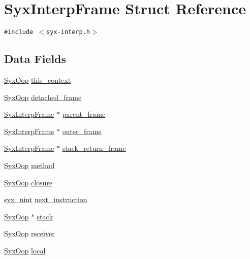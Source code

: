 \hypertarget{struct_syx_interp_frame}{
\section{SyxInterpFrame Struct Reference}
\label{struct_syx_interp_frame}
}
{\tt \#include $<$syx-interp.h$>$}

\subsection*{Data Fields}
\begin{CompactItemize}
\item 
\hyperlink{syx-types_8h_1121caba2d40b2ce090b640762744ccd}{SyxOop} \hyperlink{struct_syx_interp_frame_37d33bf761d4f34c55da10cbf9d3df63}{this\_\-context}
\item 
\hyperlink{syx-types_8h_1121caba2d40b2ce090b640762744ccd}{SyxOop} \hyperlink{struct_syx_interp_frame_f3ecaeed999a18d99d3fd27e9450ab41}{detached\_\-frame}
\item 
\hyperlink{struct_syx_interp_frame}{SyxInterpFrame} $\ast$ \hyperlink{struct_syx_interp_frame_e1b68af7dec8776cd14b3d1df923409c}{parent\_\-frame}
\item 
\hyperlink{struct_syx_interp_frame}{SyxInterpFrame} $\ast$ \hyperlink{struct_syx_interp_frame_335377c41e8c70178ad2a5ddf66508b4}{outer\_\-frame}
\item 
\hyperlink{struct_syx_interp_frame}{SyxInterpFrame} $\ast$ \hyperlink{struct_syx_interp_frame_da8f1ef4a738fbc3289aad49cf419a6e}{stack\_\-return\_\-frame}
\item 
\hyperlink{syx-types_8h_1121caba2d40b2ce090b640762744ccd}{SyxOop} \hyperlink{struct_syx_interp_frame_85720d5804b47e6f194e492075cad886}{method}
\item 
\hyperlink{syx-types_8h_1121caba2d40b2ce090b640762744ccd}{SyxOop} \hyperlink{struct_syx_interp_frame_8b361a6a8c7a7756bd7bf49adb6ebffd}{closure}
\item 
\hyperlink{syx-types_8h_488ad2504ade19c761a3e2a1726b4781}{syx\_\-nint} \hyperlink{struct_syx_interp_frame_d45f49115a5305fc901fceca4c72d32e}{next\_\-instruction}
\item 
\hyperlink{syx-types_8h_1121caba2d40b2ce090b640762744ccd}{SyxOop} $\ast$ \hyperlink{struct_syx_interp_frame_034d55521abf77019c77090a5bef941f}{stack}
\item 
\hyperlink{syx-types_8h_1121caba2d40b2ce090b640762744ccd}{SyxOop} \hyperlink{struct_syx_interp_frame_c40cce129c0dadcfe2bae7ccdbdc431b}{receiver}
\item 
\hyperlink{syx-types_8h_1121caba2d40b2ce090b640762744ccd}{SyxOop} \hyperlink{struct_syx_interp_frame_f98a9a47dea773894bddcac57c9dddb3}{local}
\end{CompactItemize}


